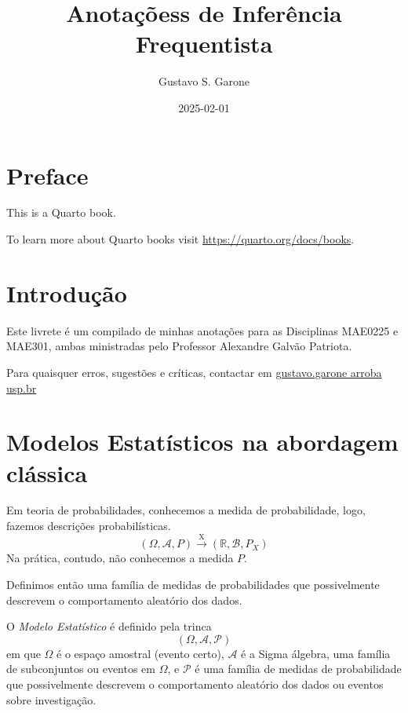 \documentclass[
  letterpaper,
  DIV=11,
  numbers=noendperiod]{scrreprt}
\title{Anotaçõess de Inferência Frequentista}
\author{Gustavo S. Garone}
\date{2025-02-01}
\renewcommand*\contentsname{Índice}
\newcommand\contentsname{Índice}
\begin{document}
\maketitle

\renewcommand*\contentsname{Índice}
{
\hypersetup{linkcolor=}
\setcounter{tocdepth}{2}
\tableofcontents
}


\chapter*{Preface}\label{preface}


This is a Quarto book.

To learn more about Quarto books visit
\url{https://quarto.org/docs/books}.


\chapter{Introdução}\label{introduuxe7uxe3o}

Este livrete é um compilado de minhas anotações para as Disciplinas
MAE0225 e MAE301, ambas ministradas pelo Professor Alexandre Galvão
Patriota.

Para quaisquer erros, sugestões e críticas, contactar em
\href{gustavo.garone@usp.br}{gustavo.garone arroba usp.br}


\chapter{Modelos Estatísticos na abordagem
clássica}\label{modelos-estatuxedsticos-na-abordagem-cluxe1ssica}

Em teoria de probabilidades, conhecemos a medida de probabilidade, logo,
fazemos descrições probabilísticas.
\[(\Omega, \mathscr{A}, P)\stackrel{\text{X}}{\rightarrow}(\mathbb{R}, \mathscr{B}, P_{X})\]
Na prática, contudo, não conhecemos a medida \(P\).

Definimos então uma família de medidas de probabilidades que
possivelmente descrevem o comportamento aleatório dos dados.

O \emph{Modelo Estatístico} é definido pela trinca
\[(\Omega, \mathscr{A}, \mathscr{P})\] em que \(\Omega\) é o espaço
amostral (evento certo), \(\mathscr{A}\) é a Sigma álgebra, uma família
de subconjuntos ou eventos em \(\Omega\), e \(\mathscr{P}\) é uma
família de medidas de probabilidade que possivelmente descrevem o
comportamento aleatório dos dados ou eventos sobre investigação.
\end{document}
